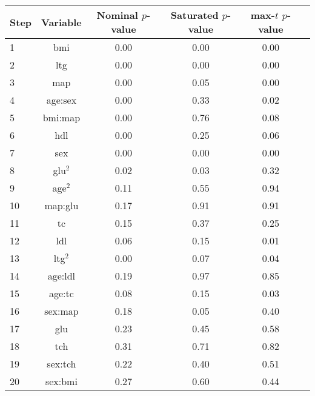 \begin{tabular}{|l|c|c|c|c|c|}
\hline
 Step & Variable &  Nominal $p$-value &  Saturated $p$-value &  max-$t$ $p$-value \\
\hline
    1 &      bmi &            0.00 &              0.00 &         0.00 \\
    2 &      ltg &            0.00 &              0.00 &         0.00 \\
    3 &      map &            0.00 &             {\color{red} 0.05} &         0.00 \\
    4 &  age:sex &            0.00 &              0.33 &         0.02 \\
    5 &  bmi:map &            0.00 &              0.76 &         0.08 \\
    6 &      hdl &            0.00 &              0.25 &         0.06 \\
    7 &      sex &            0.00 &              0.00 &         0.00 \\
    8 &    glu$^2$ &            0.02 &              0.03 &         {\color{red} 0.32} \\
    9 &    age$^2$ &            0.11 &              0.55 &         0.94 \\
   10 &  map:glu &            0.17 &              0.91 &         0.91 \\
   11 &       tc &            0.15 &              0.37 &         0.25 \\
   12 &      ldl &            0.06 &              0.15 &         0.01 \\
   13 &    ltg$^2$ &            0.00 &              0.07 &         0.04 \\
   14 &  age:ldl &            0.19 &              0.97 &         0.85 \\
   15 &   age:tc &            0.08 &              0.15 &         0.03 \\
   16 &  sex:map &            0.18 &              0.05 &         0.40 \\
   17 &      glu &            0.23 &              0.45 &         0.58 \\
   18 &      tch &       {\color{red}     0.31} &              0.71 &         0.82 \\
   19 &  sex:tch &            0.22 &              0.40 &         0.51 \\
   20 &  sex:bmi &            0.27 &              0.60 &         0.44 \\
\hline
\end{tabular}

